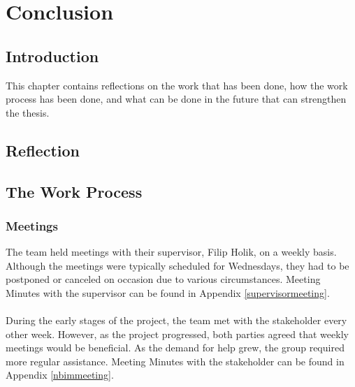 \chapter{Conclusion}
\section{Introduction}
This chapter contains reflections on the work that has been done, how the work process has been done, and what can be done in the future that can strengthen the thesis.

\section{Reflection}


\section{The Work Process}

\subsection{Meetings}
The team held meetings with their supervisor, Filip Holik, on a weekly basis. Although the meetings were typically scheduled for Wednesdays, they had to be postponed or canceled on occasion due to various circumstances. Meeting Minutes with the supervisor can be found in Appendix \ref{supervisormeeting}.
\\~\\
During the early stages of the project, the team met with the stakeholder every other week. However, as the project progressed, both parties agreed that weekly meetings would be beneficial. As the demand for help grew, the group required more regular assistance. Meeting Minutes with the stakeholder can be found in Appendix \ref{nbimmeeting}.  




